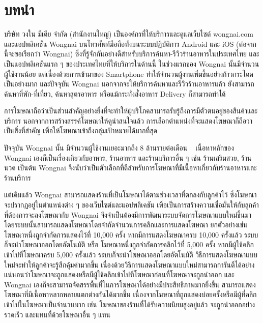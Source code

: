 \chapter{บทนำ}
\label{chapter:introduction}

บริษัท วงใน มีเดีย จำกัด (สำนักงานใหญ่) เป็นองค์กรที่ให้บริการและดูแลเว็บไซต์ wongnai.com และแอปพลิเคชัน Wongnai บนโทรศัพท์มือถือทั้งบนระบบปฏิบัติการ Android และ iOS (ต่อจากนี้จะขอเรียกว่า Wongnai) ซึ่งที่รู้จักกันอย่างดีสำหรับบริการค้นหา-รีวิวร้านอาหารในประเทศไทย และเป็นแอปพลิเคชันแรก ๆ ของประเทศไทยที่ให้บริการในด้านนี้ ในช่วงแรกของ Wongnai นั้นมีจำนวนผู้ใช้งานน้อย แต่เนื่องด้วยการเข้ามาของ Smartphone ทำให้จำนวนผู้งานเพิ่มขึ้นอย่างก้าวกระโดดเป็นอย่างมาก และปัจจุบัน Wongnai นอกจากจะให้บริการค้นหาและรีวิวร้านอาหารแล้ว ยังสามารถค้นหาที่พัก-ที่เที่ยว, ค้นหาสูตรอาหาร หรือแม้กระทั่งสั่งอาหาร Delivery ก็สามารถทำได้

การโฆษณาถือว่าเป็นส่วนสำคัญอย่างยิ่งที่จะทำให้ผู้บริโภคสามารถรับรู้ถึงการมีตัวตนอยู่ของสินค้าและบริการ นอกจากการสร้างสรรค์โฆษณาให้ดูน่าสนใจแล้ว การเลือกตำแหน่งที่จะแสดงโฆษณาก็ถือว่าเป็นสิ่งที่สำคัญ เพื่อให้โฆษณาเข้าถึงกลุ่มเป้าหมายได้มากที่สุด

ปัจจุบัน Wongnai นั้น มีจำนวนผู้ใช้งานเยอะมากถึง 8 ล้านรายต่อเดือน ~\cite{wongnai} เนื้อหาหลักของ Wongnai เองก็เป็นเรื่องเกี่ยวกับอาหาร, ร้านอาหาร และร้านบริการอื่น ๆ เช่น ร้านเสริมสวย, ร้านนวด เป็นต้น Wongnai จึงนับว่าเป็นตัวเลือกที่ดีสำหรับการโฆษณาที่มีเนื้อหาเกี่ยวกับร้านอาหารและร้านบริการ

แต่เดิมแล้ว Wongnai สามารถแสดงร้านที่เป็นโฆษณาได้ตามช่วงเวลาที่ตกลงกับลูกค้าไว้ ซึ่งโฆษณาจะปรากฏอยู่ในตำแหน่งต่าง ๆ ของเว็บไซต์และแอปพลิเคชัน
เพื่อเป็นการสร้างความเชื่อมั่นให้กับลูกค้าที่ต้องการจะลงโฆษณากับ Wongnai จึงจำเป็นต้องมีการพัฒนาระบบจัดการโฆษณาแบบใหม่ขึ้นมา โดยระบบนั้นสามารถแสดงโฆษณาโดยจำกัดจำนวนการคลิกและการแสดงโฆษณา ยกตัวอย่างเช่น โฆษณาหนึ่งถูกจำกัดการแสดงไว้ที่ 10,000 ครั้ง หากมีการแสดงโฆษณาครบ 10,000 ครั้งแล้ว ระบบก็จะนำโฆษณาออกโดยอัตโนมัติ หรือ โฆษณาหนึ่งถูกจำกัดการคลิกไว้ที่ 5,000 ครั้ง หากมีผู้ใช้คลิกเข้าไปที่โฆษณาครบ 5,000 ครั้งแล้ว ระบบก็จะนำโฆษณาออกโดยอัตโนมัติ วิธีการแสดงโฆษณาแบบใหม่จะทำให้ลูกค้าจะรู้สึกคุ้มค่ามากขึ้น เนื่องด้วยวิธีการแสดงโฆษณาแบบใหม่สามารถการันตีได้อย่างแน่นอนว่าโฆษณาจะถูกแสดงหรือมีผู้ใช้คลิกเข้าไปที่โฆษณาก่อนที่โฆษณาจะถูกนำออก และ Wongnai เองก็จะสามารถจัดสรรพื้นที่ในการโฆษณาได้อย่างมีประสิทธิภาพมากยิ่งขึ้น สามารถแสดงโฆษณาที่มีเนื้อหาหลากหลายแตกต่างกันได้มากขึ้น เนื่องจากโฆษณาที่ถูกแสดงบ่อยครั้งหรือมีผู้ที่คลิกเข้าไปในโฆษณาเป็นจำนวนมาก เช่น โฆษณาของร้านที่ได้รับความนิยมสูงอยู่แล้ว จะถูกนำออกอย่างรวดเร็ว และแทนที่ด้วยโฆษณาอื่น ๆ แทน

